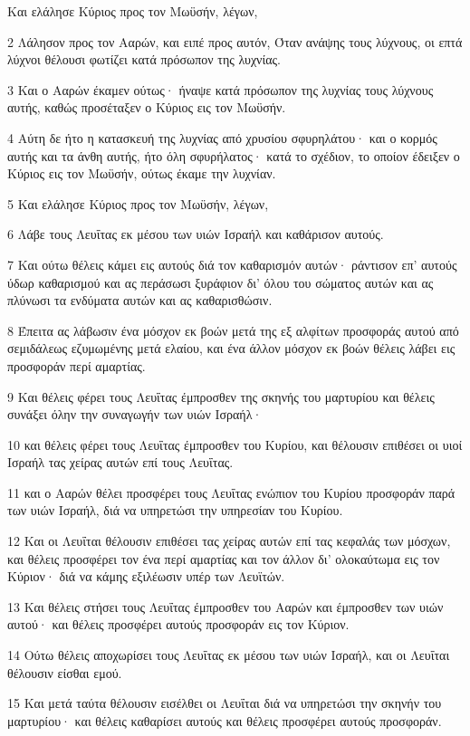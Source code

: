\par Και ελάλησε Κύριος προς τον Μωϋσήν, λέγων,
\par 2 Λάλησον προς τον Ααρών, και ειπέ προς αυτόν, Όταν ανάψης τους λύχνους, οι επτά λύχνοι θέλουσι φωτίζει κατά πρόσωπον της λυχνίας.
\par 3 Και ο Ααρών έκαμεν ούτως· ήναψε κατά πρόσωπον της λυχνίας τους λύχνους αυτής, καθώς προσέταξεν ο Κύριος εις τον Μωϋσήν.
\par 4 Αύτη δε ήτο η κατασκευή της λυχνίας από χρυσίου σφυρηλάτου· και ο κορμός αυτής και τα άνθη αυτής, ήτο όλη σφυρήλατος· κατά το σχέδιον, το οποίον έδειξεν ο Κύριος εις τον Μωϋσήν, ούτως έκαμε την λυχνίαν.
\par 5 Και ελάλησε Κύριος προς τον Μωϋσήν, λέγων,
\par 6 Λάβε τους Λευΐτας εκ μέσου των υιών Ισραήλ και καθάρισον αυτούς.
\par 7 Και ούτω θέλεις κάμει εις αυτούς διά τον καθαρισμόν αυτών· ράντισον επ' αυτούς ύδωρ καθαρισμού και ας περάσωσι ξυράφιον δι' όλου του σώματος αυτών και ας πλύνωσι τα ενδύματα αυτών και ας καθαρισθώσιν.
\par 8 Έπειτα ας λάβωσιν ένα μόσχον εκ βοών μετά της εξ αλφίτων προσφοράς αυτού από σεμιδάλεως εζυμωμένης μετά ελαίου, και ένα άλλον μόσχον εκ βοών θέλεις λάβει εις προσφοράν περί αμαρτίας.
\par 9 Και θέλεις φέρει τους Λευΐτας έμπροσθεν της σκηνής του μαρτυρίου και θέλεις συνάξει όλην την συναγωγήν των υιών Ισραήλ·
\par 10 και θέλεις φέρει τους Λευΐτας έμπροσθεν του Κυρίου, και θέλουσιν επιθέσει οι υιοί Ισραήλ τας χείρας αυτών επί τους Λευΐτας.
\par 11 και ο Ααρών θέλει προσφέρει τους Λευΐτας ενώπιον του Κυρίου προσφοράν παρά των υιών Ισραήλ, διά να υπηρετώσι την υπηρεσίαν του Κυρίου.
\par 12 Και οι Λευΐται θέλουσιν επιθέσει τας χείρας αυτών επί τας κεφαλάς των μόσχων, και θέλεις προσφέρει τον ένα περί αμαρτίας και τον άλλον δι' ολοκαύτωμα εις τον Κύριον· διά να κάμης εξιλέωσιν υπέρ των Λευϊτών.
\par 13 Και θέλεις στήσει τους Λευΐτας έμπροσθεν του Ααρών και έμπροσθεν των υιών αυτού· και θέλεις προσφέρει αυτούς προσφοράν εις τον Κύριον.
\par 14 Ούτω θέλεις αποχωρίσει τους Λευΐτας εκ μέσου των υιών Ισραήλ, και οι Λευΐται θέλουσιν είσθαι εμού.
\par 15 Και μετά ταύτα θέλουσιν εισέλθει οι Λευΐται διά να υπηρετώσι την σκηνήν του μαρτυρίου· και θέλεις καθαρίσει αυτούς και θέλεις προσφέρει αυτούς προσφοράν.
